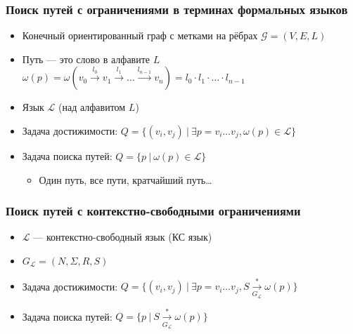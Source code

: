 \documentclass[xcolor=table]{beamer}
\begin{document}
\begin{frame} \frametitle{Поиск путей с ограничениями в терминах формальных языков}
\begin{itemize}
\item Конечный ориентированный граф с метками на рёбрах $\mathcal{G} = (V,E,L)$
\item Путь --- это слово в алфавите $L$ $\omega(p) = \omega(v_0 \xrightarrow{l_0} v_1 \xrightarrow{l_1} \dots \xrightarrow{l_{n-1}} v_n ) = l_0 \cdot l_1 \cdot \ldots \cdot l_{n-1}$
\item Язык $\mathcal{L}$ (над алфавитом $L$)
\end{itemize}
\pause
\begin{itemize}
  \item Задача достижимости: $Q=\{(v_i,v_j) \ | \ \exists p = v_i \dots v_j, \omega(p) \in \mathcal{L}\}$
  \item Задача поиска путей: $Q=\{p \ | \ \omega(p) \in \mathcal{L}\}$
  \begin{itemize}
    \item Один путь, все пути, кратчайший путь\dots
  \end{itemize}
\end{itemize}

\end{frame}

\begin{frame} \frametitle{Поиск путей с контекстно-свободными ограничениями}
\begin{itemize}
\item $\mathcal{L}$ --- контекстно-свободный язык (КС язык)
\item $G_{\mathcal{L}} = (N,\Sigma,R,S)$
\item Задача достижимости: $Q=\{(v_i,v_j) \ | \ \exists p = v_i \dots v_j, S \xrightarrow[G_{\mathcal{L}}]{*} \omega(p) \}$
\item Задача поиска путей: $Q=\{p \ | \ S \xrightarrow[G_{\mathcal{L}}]{*} \omega(p)\}$
\end{itemize}

\end{frame}
\end{document}
